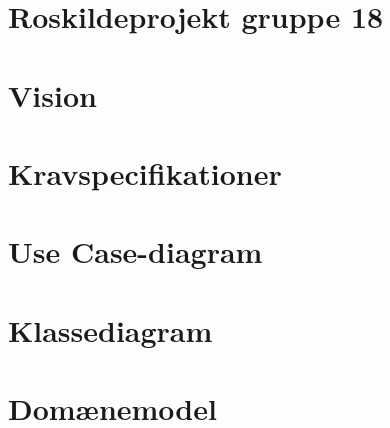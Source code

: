 


\section{Roskildeprojekt gruppe 18}

\section{Vision}

\section{Kravspecifikationer}

\section{Use Case-diagram}

\section{Klassediagram}

\section{Domænemodel}


